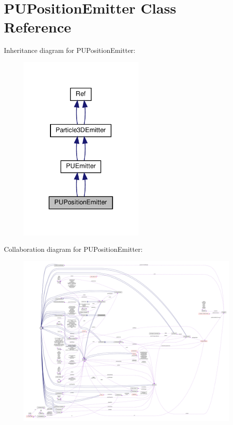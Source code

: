 \hypertarget{classPUPositionEmitter}{}\section{P\+U\+Position\+Emitter Class Reference}
\label{classPUPositionEmitter}


Inheritance diagram for P\+U\+Position\+Emitter\+:
\nopagebreak
\begin{figure}[H]
\begin{center}
\leavevmode
\includegraphics[width=178pt]{classPUPositionEmitter__inherit__graph}
\end{center}
\end{figure}


Collaboration diagram for P\+U\+Position\+Emitter\+:
\nopagebreak
\begin{figure}[H]
\begin{center}
\leavevmode
\includegraphics[width=350pt]{classPUPositionEmitter__coll__graph}
\end{center}
\end{figure}

